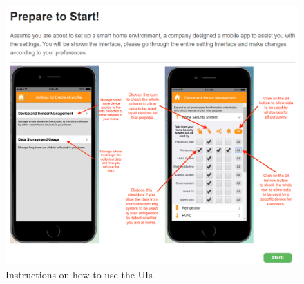 \begin{appendices}
\begin{figure}
	\centering
	\includegraphics[width=\textwidth]{figures/yangPrepage.png}
	\caption{Instructions on how to use the UIs}
	\label{fig:yangPrepage}
\end{figure}



    

   





    
    

\end{appendices}
